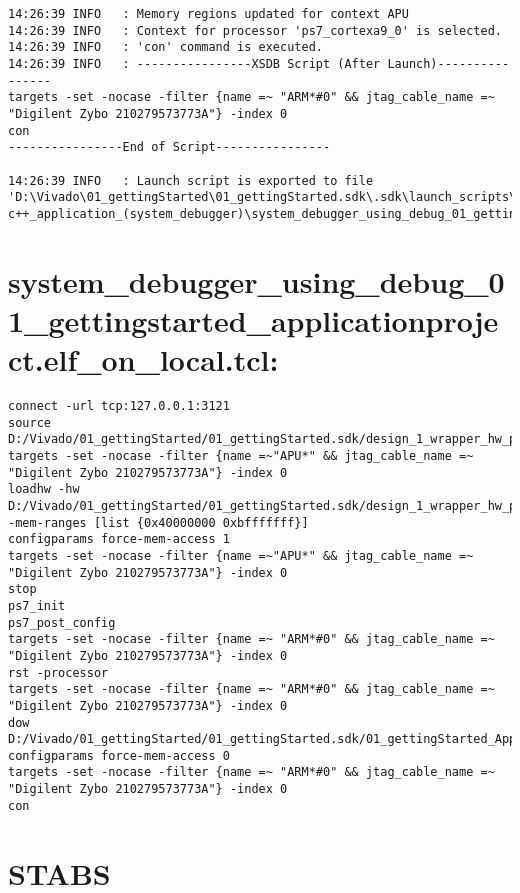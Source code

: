 \begin{lstlisting}
14:26:39 INFO	: Memory regions updated for context APU
14:26:39 INFO	: Context for processor 'ps7_cortexa9_0' is selected.
14:26:39 INFO	: 'con' command is executed.
14:26:39 INFO	: ----------------XSDB Script (After Launch)----------------
targets -set -nocase -filter {name =~ "ARM*#0" && jtag_cable_name =~ "Digilent Zybo 210279573773A"} -index 0
con
----------------End of Script----------------

14:26:39 INFO	: Launch script is exported to file 'D:\Vivado\01_gettingStarted\01_gettingStarted.sdk\.sdk\launch_scripts\xilinx_c-c++_application_(system_debugger)\system_debugger_using_debug_01_gettingstarted_applicationproject.elf_on_local.tcl'
\end{lstlisting}


\section{system\_debugger\_using\_debug\_01\_gettingstarted\_applicationproject.elf\_on\_local.tcl:}
\label{anhang:elf_on_local.tcl}
\lstset{language=plain}
\begin{lstlisting}
connect -url tcp:127.0.0.1:3121
source D:/Vivado/01_gettingStarted/01_gettingStarted.sdk/design_1_wrapper_hw_platform_0/ps7_init.tcl
targets -set -nocase -filter {name =~"APU*" && jtag_cable_name =~ "Digilent Zybo 210279573773A"} -index 0
loadhw -hw D:/Vivado/01_gettingStarted/01_gettingStarted.sdk/design_1_wrapper_hw_platform_0/system.hdf -mem-ranges [list {0x40000000 0xbfffffff}]
configparams force-mem-access 1
targets -set -nocase -filter {name =~"APU*" && jtag_cable_name =~ "Digilent Zybo 210279573773A"} -index 0
stop
ps7_init
ps7_post_config
targets -set -nocase -filter {name =~ "ARM*#0" && jtag_cable_name =~ "Digilent Zybo 210279573773A"} -index 0
rst -processor
targets -set -nocase -filter {name =~ "ARM*#0" && jtag_cable_name =~ "Digilent Zybo 210279573773A"} -index 0
dow D:/Vivado/01_gettingStarted/01_gettingStarted.sdk/01_gettingStarted_ApplicationProject/Debug/01_gettingStarted_ApplicationProject.elf
configparams force-mem-access 0
targets -set -nocase -filter {name =~ "ARM*#0" && jtag_cable_name =~ "Digilent Zybo 210279573773A"} -index 0
con
\end{lstlisting}







\section{STABS}
\label{anhang:stabs}


